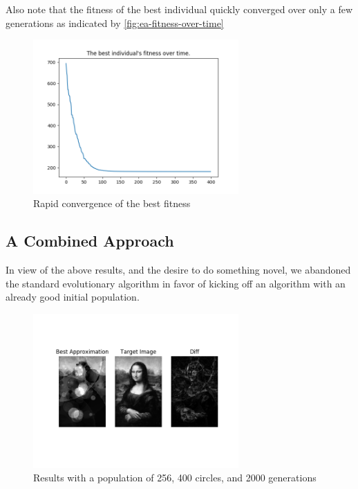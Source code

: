 \documentclass{article}
\begin{document}
Also note that the fitness of the best individual quickly converged over only a few generations as
indicated by \autoref{fig:ea-fitness-over-time}

\begin{figure}[H]
    \centering
    \includegraphics[width=0.7\textwidth]{output/ea-cooler-p100c200g400-fitness.png}
    \caption{Rapid convergence of the best fitness}\label{fig:ea-fitness-over-time}
\end{figure}

\subsection{A Combined Approach}\label{sec:results:combined-approach}
In view of the above results, and the desire to do something novel, we abandoned the standard
evolutionary algorithm in favor of kicking off an algorithm with an already good initial
population.

\begin{figure}[H]
    \centering
    \includegraphics[width=0.7\textwidth]{output/ca-p256c400g2000.png}
    \caption{Results with a population of 256, 400 circles, and 2000
        generations}\label{fig:ca-p256-c400-g2000}
\end{figure}
\end{document}
